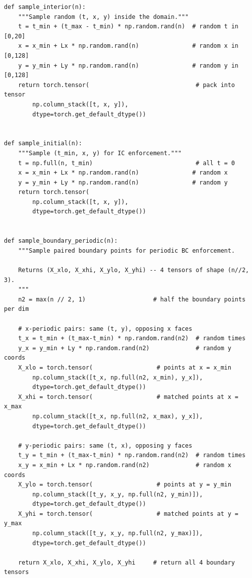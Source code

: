 \documentclass[11pt,a4paper]{article}
\begin{document}
\begin{lstlisting}
def sample_interior(n):
    """Sample random (t, x, y) inside the domain."""
    t = t_min + (t_max - t_min) * np.random.rand(n)  # random t in [0,20]
    x = x_min + Lx * np.random.rand(n)               # random x in [0,128]
    y = y_min + Ly * np.random.rand(n)               # random y in [0,128]
    return torch.tensor(                              # pack into tensor
        np.column_stack([t, x, y]),
        dtype=torch.get_default_dtype())


def sample_initial(n):
    """Sample (t_min, x, y) for IC enforcement."""
    t = np.full(n, t_min)                             # all t = 0
    x = x_min + Lx * np.random.rand(n)               # random x
    y = y_min + Ly * np.random.rand(n)               # random y
    return torch.tensor(
        np.column_stack([t, x, y]),
        dtype=torch.get_default_dtype())


def sample_boundary_periodic(n):
    """Sample paired boundary points for periodic BC enforcement.

    Returns (X_xlo, X_xhi, X_ylo, X_yhi) -- 4 tensors of shape (n//2, 3).
    """
    n2 = max(n // 2, 1)                   # half the boundary points per dim

    # x-periodic pairs: same (t, y), opposing x faces
    t_x = t_min + (t_max-t_min) * np.random.rand(n2)  # random times
    y_x = y_min + Ly * np.random.rand(n2)             # random y coords
    X_xlo = torch.tensor(                  # points at x = x_min
        np.column_stack([t_x, np.full(n2, x_min), y_x]),
        dtype=torch.get_default_dtype())
    X_xhi = torch.tensor(                  # matched points at x = x_max
        np.column_stack([t_x, np.full(n2, x_max), y_x]),
        dtype=torch.get_default_dtype())

    # y-periodic pairs: same (t, x), opposing y faces
    t_y = t_min + (t_max-t_min) * np.random.rand(n2)  # random times
    x_y = x_min + Lx * np.random.rand(n2)             # random x coords
    X_ylo = torch.tensor(                  # points at y = y_min
        np.column_stack([t_y, x_y, np.full(n2, y_min)]),
        dtype=torch.get_default_dtype())
    X_yhi = torch.tensor(                  # matched points at y = y_max
        np.column_stack([t_y, x_y, np.full(n2, y_max)]),
        dtype=torch.get_default_dtype())

    return X_xlo, X_xhi, X_ylo, X_yhi     # return all 4 boundary tensors
\end{lstlisting}


\end{document}
